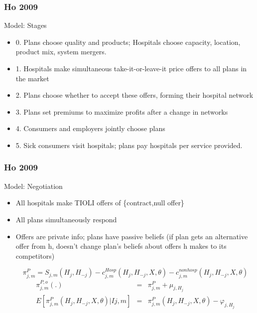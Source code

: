 \begin{frame}
\frametitle{Ho 2009}

Model: Stages
\begin{itemize}
\item 0. Plans choose quality and products; Hospitals choose capacity, location, product mix, system mergers.
\item 1. Hospitals make simultaneous take-it-or-leave-it price offers to all plans in the market
\item 2. Plans choose whether to accept these offers, forming their hospital network
\item 3. Plans set premiums to maximize profits after a change in networks
\item 4. Consumers and employers jointly choose plans
\item 5. Sick consumers visit hospitals; plans pay hospitals per service provided.
\end{itemize}
\end{frame}

\begin{frame}
\frametitle{Ho 2009}

Model: Negotiation
\begin{itemize}
\item All hospitals make TIOLI offers of \{contract,null offer\}
\item All plans simultaneously respond
\item Offers are private info; plans have passive beliefs (if plan gets an alternative offer from h, doesn't change plan's beliefs about offers h makes to its competitors)

\[
\pi _{j,m}^{P} =S_{j,m}(H_{j},H_{-j})-c_{j,m}^{Hosp}(H_{j},H_{-j},X,\theta
)-c_{j,m}^{nonhosp}(H_{j},H_{-j},X,\theta )
\]
\begin{eqnarray*}
\pi _{j,m}^{P,o}(.) &=&\pi _{j,m}^{P}+\mu _{j,H_{j}} \\
E[\pi _{j,m}^{P}(H_{j},H_{-j},X,\theta )|Ij,m] &=&\pi
_{j,m}^{P}(H_{j},H_{-j},X,\theta )-\varphi _{j,H_{j}}
\end{eqnarray*}

\end{itemize}

\end{frame}

